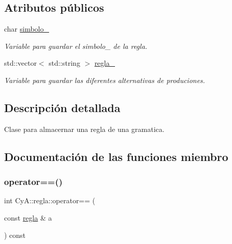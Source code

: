 \subsection*{Atributos públicos}
\begin{DoxyCompactItemize}
\item 
\mbox{\label{class_cy_a_1_1regla_acee8a4eb2a2905af6dd1c3236261d1cc}} 
char \mbox{\hyperlink{class_cy_a_1_1regla_acee8a4eb2a2905af6dd1c3236261d1cc}{simbolo\+\_\+}}
\begin{DoxyCompactList}\small\item\em Variable para guardar el simbolo\+\_\+ de la regla. \end{DoxyCompactList}\item 
\mbox{\label{class_cy_a_1_1regla_a7bb5b7c78939e006e12a908799d36028}} 
std\+::vector$<$ std\+::string $>$ \mbox{\hyperlink{class_cy_a_1_1regla_a7bb5b7c78939e006e12a908799d36028}{regla\+\_\+}}
\begin{DoxyCompactList}\small\item\em Variable para guardar las diferentes alternativas de produciones. \end{DoxyCompactList}\end{DoxyCompactItemize}


\subsection{Descripción detallada}
Clase para almacernar una regla de una gramatica. 

\subsection{Documentación de las funciones miembro}
\mbox{\label{class_cy_a_1_1regla_a0959c90f17fdc569bec1faeb9af04d41}} 
\subsubsection{\texorpdfstring{operator==()}{operator==()}}
{\footnotesize\ttfamily int Cy\+A\+::regla\+::operator== (\begin{DoxyParamCaption}\item[{const \mbox{\hyperlink{class_cy_a_1_1regla}{regla}} \&}]{a }\end{DoxyParamCaption}) const}



